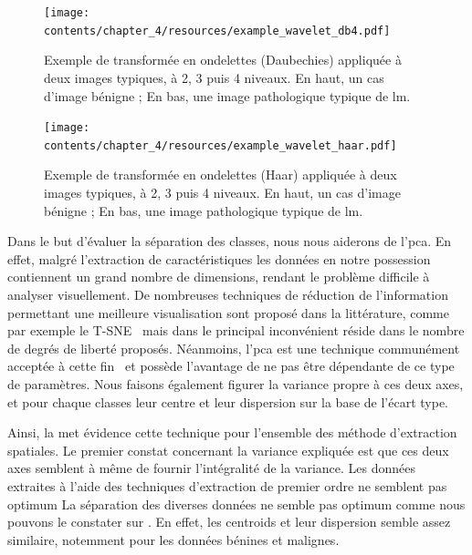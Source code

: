 \begin{figure}[H]
    \centering
    \texttt{[image: contents/chapter\_4/resources/example\_wavelet\_db4.pdf]}
    \caption{Exemple de transformée en ondelettes (Daubechies) appliquée à deux images typiques, à 2, 3 puis 4 niveaux. En haut, un cas d'image bénigne ; En bas, une image pathologique typique de \gls{lm}.}
    \label{fig:example_wavelet_db4}
\end{figure}\par

\begin{figure}[H]
    \centering
    \texttt{[image: contents/chapter\_4/resources/example\_wavelet\_haar.pdf]}
    \caption{Exemple de transformée en ondelettes (Haar) appliquée à deux images typiques, à 2, 3 puis 4 niveaux. En haut, un cas d'image bénigne ; En bas, une image pathologique typique de \gls{lm}.}
    \label{fig:example_wavelet_haar}
\end{figure}\par

Dans le but d'évaluer la séparation des classes, nous nous aiderons de l'\gls{pca}. En effet, malgré l'extraction de caractéristiques les données en notre possession contiennent un grand nombre de dimensions, rendant le problème difficile à analyser visuellement. De nombreuses techniques de réduction de l'information permettant une meilleure visualisation sont proposé dans la littérature, comme par exemple le T-SNE~\cite{Maaten2008} mais dans le principal inconvénient réside dans le nombre de degrés de liberté proposés. Néanmoins, l'\gls{pca} est une technique communément acceptée à cette fin~\cite{Himberg2001} et possède l'avantage de ne pas être dépendante de ce type de paramètres. Nous faisons également figurer la variance propre à ces deux axes, et pour chaque classes leur centre et leur dispersion sur la base de l'écart type.\par

Ainsi, la  met évidence cette technique pour l'ensemble des méthode d'extraction spatiales. Le premier constat concernant la variance expliquée est que ces deux axes semblent à même de fournir l'intégralité de la variance. Les données extraites à l'aide des techniques d'extraction de premier ordre ne semblent pas optimum
La séparation des diverses données ne semble pas optimum comme nous pouvons le constater sur . En effet, les centroids et leur dispersion semble assez similaire, notemment pour les données bénines et malignes.\par

